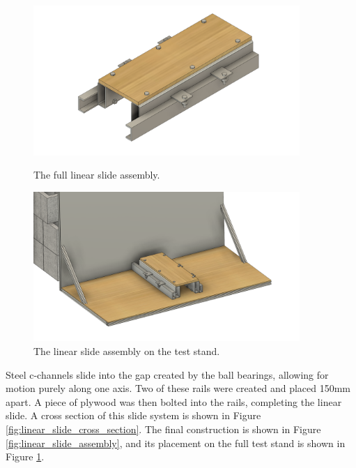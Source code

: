 \documentclass[9pt]{article} %
\numberwithin{equation}{section} %
\begin{document}
\begin{figure}
    \centering
    \begin{minipage}{0.49\textwidth}
        \centering
        \includegraphics[scale=0.5, width=0.9\textwidth, trim={5cm 0cm 5cm 0cm}, clip]{cad_files/Linear Slide v14.png} %
        \caption{The full linear slide assembly.}
        \label{fig:linear_slide_assembly}
    \end{minipage}\hfill
    \begin{minipage}{0.49\textwidth}
        \centering
        \includegraphics[scale=0.5, width=0.9\textwidth, trim={5cm 0cm 5cm 0cm}, clip]{cad_files/Rail System Test Stand.png} %
        \caption{The linear slide assembly on the test stand.}
        \label{fig:linear_slide_test_stand}
    \end{minipage}
\end{figure} 

Steel c-channels slide into the gap created by the ball bearings, allowing for motion purely along one axis. Two of these rails were created and placed 150mm apart. A piece of plywood was then bolted into the rails, completing the linear slide. A cross section of this slide system is shown in Figure \ref{fig:linear_slide_cross_section}. The final construction is shown in Figure \ref{fig:linear_slide_assembly}, and its placement on the full test stand is shown in Figure \ref{fig:linear_slide_test_stand}.
\end{document}
